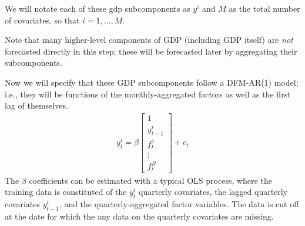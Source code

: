 \documentclass[11pt, letterpaper]{article}\usepackage[]{graphicx}\usepackage[]{color}
\begin{document}
We will notate each of these gdp subcomponents as $y^i$ and $M$ as the total number of covariates, so that $i = 1, \dots, M$.

Note that many higher-level components of GDP (including GDP itself) are \textit{not} forecasted directly in this step; these will be forecasted later by aggregating their subcomponents.

Now we will specify that these GDP subcomponents follow a DFM-AR(1) model; i.e., they will be functions of the monthly-aggregated factors as well as the first lag of themselves.
\begin{align*}
	y^i_t
	=
	\beta
	\begin{bmatrix}
	1 \\
	y^i_{t-1}\\
	f^1_t \\
	\vdots\\
	f^R_t
	\end{bmatrix}
	+
	e_t
\end{align*}
The $\beta$ coefficients can be estimated with a typical OLS process, where the training data is constituted of the $y^i_t$ quarterly covariates, the lagged quarterly covariates $y^i_{t-1}$, and the quarterly-aggregated factor variables. The data is cut off at the date for which the any data on the quarterly covariates are missing.
\end{document}
